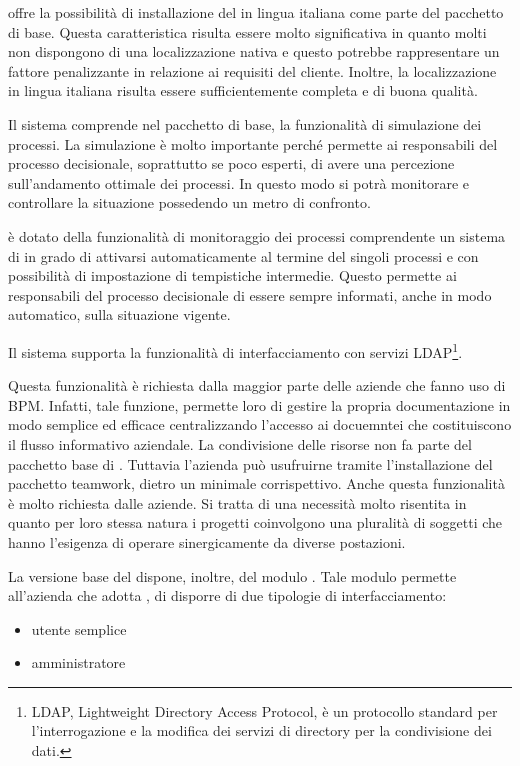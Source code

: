 \progname offre la possibilità di installazione del \sw in lingua italiana come parte del pacchetto di base. Questa caratteristica risulta essere molto significativa in quanto molti \sw non dispongono di una localizzazione nativa e questo potrebbe rappresentare un fattore penalizzante in relazione ai requisiti del cliente. Inoltre, la localizzazione in lingua italiana risulta essere sufficientemente completa e di buona qualità.

 Il sistema \progname comprende nel pacchetto di base, la funzionalità di simulazione dei processi. La simulazione è molto importante perché permette ai responsabili del processo decisionale, soprattutto se poco esperti, di avere una percezione sull'andamento ottimale dei processi. In questo modo si potrà monitorare e controllare la situazione possedendo un metro di confronto.

\progname è dotato della funzionalità di monitoraggio dei processi comprendente un sistema di  in grado di attivarsi automaticamente al termine del singoli processi e con possibilità di impostazione di tempistiche intermedie. Questo permette ai responsabili del processo decisionale di essere sempre informati, anche in modo automatico, sulla situazione vigente.

Il sistema supporta la funzionalità di interfacciamento con servizi LDAP\footnote{LDAP,  Lightweight Directory Access Protocol, è un protocollo standard per l'interrogazione e la modifica dei servizi di directory per la condivisione dei dati.\label{note:ldap}}. 

Questa funzionalità è richiesta dalla maggior parte delle aziende che fanno uso di \sw BPM. Infatti, tale funzione, permette loro di gestire la propria documentazione in modo semplice ed efficace centralizzando l'accesso ai docuemntei che costituiscono il flusso informativo aziendale.
La condivisione delle risorse non fa parte del pacchetto base di \progname. 
Tuttavia l'azienda può usufruirne tramite l'installazione del pacchetto \textsf{teamwork}, dietro un minimale corrispettivo.
Anche questa funzionalità è molto richiesta dalle aziende. Si tratta di una necessità molto risentita in quanto per loro stessa natura i progetti coinvolgono una pluralità di soggetti che hanno l'esigenza di  operare sinergicamente da diverse postazioni.

La versione base del \sw dispone, inoltre, del modulo . Tale modulo permette all'azienda che adotta , di disporre di due tipologie di interfacciamento:
\begin{itemize}
 \item utente semplice
 \item amministratore
\end{itemize}

